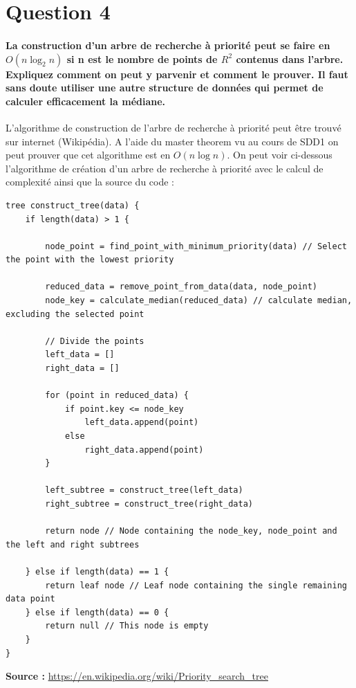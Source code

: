 \documentclass{article}
\begin{document}
\section{Question 4}
    \paragraph{La construction d’un arbre de recherche à priorité peut se faire en $O(n \log_2 n)$ si n est le
        nombre de points de $R^2$ contenus dans l’arbre. Expliquez comment on peut y parvenir et
    comment le prouver. Il faut sans doute utiliser une autre structure de données qui permet
    de calculer efficacement la médiane.}
    L'algorithme de construction de l'arbre de recherche à priorité peut être trouvé sur internet (Wikipédia). A l'aide du master theorem
    vu au cours de SDD1 on peut prouver que cet algorithme est en $O(n \log n)$. On peut voir ci-dessous l'algorithme de création d'un arbre 
    de recherche à priorité avec le calcul de complexité ainsi que la source du code : 
    \medskip
    \begin{lstlisting}
tree construct_tree(data) {
    if length(data) > 1 {
            
        node_point = find_point_with_minimum_priority(data) // Select the point with the lowest priority
              
        reduced_data = remove_point_from_data(data, node_point)
        node_key = calculate_median(reduced_data) // calculate median, excluding the selected point
              
        // Divide the points 
        left_data = []
        right_data = []    
             
        for (point in reduced_data) {
            if point.key <= node_key
                left_data.append(point)
            else
                right_data.append(point)
        }
          
        left_subtree = construct_tree(left_data)
        right_subtree = construct_tree(right_data)
          
        return node // Node containing the node_key, node_point and the left and right subtrees
          
    } else if length(data) == 1 {
        return leaf node // Leaf node containing the single remaining data point
    } else if length(data) == 0 {
        return null // This node is empty
    }
}

    \end{lstlisting}
\medskip
    \textbf{Source : } \url{https://en.wikipedia.org/wiki/Priority_search_tree}\\
\end{document}
